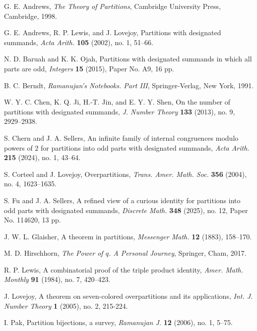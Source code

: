 \documentclass[12pt,reqno]{amsart}
\numberwithin{equation}{section}
\theoremstyle{plain}
\theoremstyle{definition}
\theoremstyle{named}
\begin{document}

\begin{thebibliography}{99}
	
	G. E. Andrews, \textit{The Theory of Partitions}, Cambridge University Press, Cambridge, 1998.
	
	G. E. Andrews, R. P. Lewis, and J. Lovejoy, Partitions with designated summands, \textit{Acta Arith.} \textbf{105} (2002), no. 1, 51--66.
	
	N. D. Baruah and K. K. Ojah, Partitions with designated summands in which all parts are odd, \textit{Integers} \textbf{15} (2015), Paper No. A9, 16 pp.
	
	B. C. Berndt, \textit{Ramanujan's Notebooks. Part III}, Springer-Verlag, New York, 1991.
	
	W. Y. C. Chen, K. Q. Ji, H.-T. Jin, and E. Y. Y. Shen, 
	On the number of partitions with designated summands, \textit{J. Number Theory} \textbf{133} (2013), no. 9, 2929--2938.
	
	S. Chern and J. A. Sellers, An infinite family of internal congruences modulo powers of $2$ for partitions into odd parts with designated summands, \textit{Acta Arith.} \textbf{215} (2024), no. 1, 43--64.
	
	S. Corteel and J. Lovejoy, Overpartitions, \textit{Trans. Amer. Math. Soc.} \textbf{356} (2004), no. 4, 1623--1635.
	
	S. Fu and J. A. Sellers, A refined view of a curious identity for partitions into odd parts with designated summands, \textit{Discrete Math.} \textbf{348} (2025), no. 12, Paper No. 114620, 13 pp.
	
	J. W. L. Glaisher, A theorem in partitions, \textit{Messenger Math.} \textbf{12} (1883), 158--170.
	
	M. D. Hirschhorn, \textit{The Power of $q$. A Personal Journey}, Springer, Cham, 2017.
	
	R. P. Lewis, A combinatorial proof of the triple product identity, \textit{Amer. Math. Monthly} \textbf{91} (1984), no. 7, 420--423.

	J. Lovejoy, A theorem on seven-colored overpartitions and its applications, \textit{Int. J. Number Theory} \textbf{1} (2005), no. 2, 215-224.
	
	I. Pak, Partition bijections, a survey, \textit{Ramanujan J.} \textbf{12} (2006), no. 1, 5--75.
	

\end{thebibliography}
\end{document}

